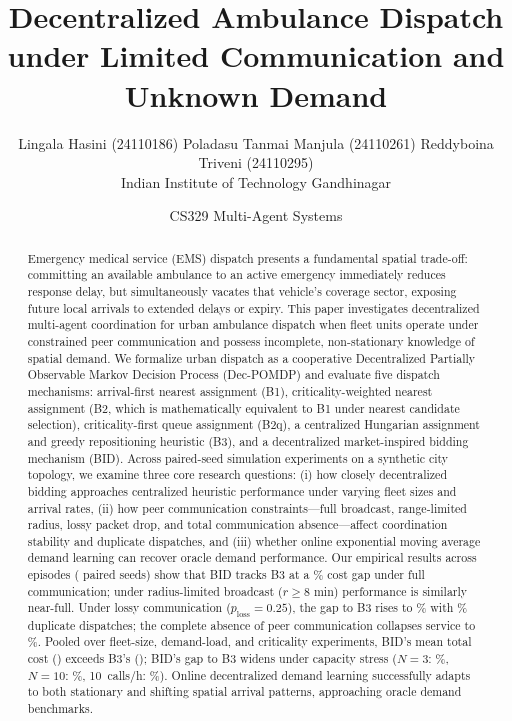\documentclass{article}
\title{Decentralized Ambulance Dispatch under Limited Communication and Unknown Demand}
\author{Lingala Hasini (24110186) \And Poladasu Tanmai Manjula (24110261) \And Reddyboina Triveni (24110295)\\[3pt]
Indian Institute of Technology Gandhinagar}
\date{CS329 Multi-Agent Systems}
\begin{document}
\maketitle

\begin{abstract}
Emergency medical service (EMS) dispatch presents a fundamental spatial trade-off: committing an available ambulance to an active emergency immediately reduces response delay, but simultaneously vacates that vehicle's coverage sector, exposing future local arrivals to extended delays or expiry. This paper investigates decentralized multi-agent coordination for urban ambulance dispatch when fleet units operate under constrained peer communication and possess incomplete, non-stationary knowledge of spatial demand. We formalize urban dispatch as a cooperative Decentralized Partially Observable Markov Decision Process (Dec-POMDP) and evaluate five dispatch mechanisms: arrival-first nearest assignment (B1), criticality-weighted nearest assignment (B2, which is mathematically equivalent to B1 under nearest candidate selection), criticality-first queue assignment (B2q), a centralized Hungarian assignment and greedy repositioning heuristic (B3), and a decentralized market-inspired bidding mechanism (BID). Across paired-seed simulation experiments on a synthetic city topology, we examine three core research questions: (i) how closely decentralized bidding approaches centralized heuristic performance under varying fleet sizes and arrival rates, (ii) how peer communication constraints---full broadcast, range-limited radius, lossy packet drop, and total communication absence---affect coordination stability and duplicate dispatches, and (iii) whether online exponential moving average demand learning can recover oracle demand performance. Our empirical results across \NPolicyRuns{} episodes (\NScenarioSeeds{} paired seeds) show that BID tracks B3 at a \FullBIDCostGapPercent\% cost gap under full communication; under radius-limited broadcast ($r \ge 8$ min) performance is similarly near-full. Under lossy communication ($p_{\mathrm{loss}}=0.25$), the gap to B3 rises to \LossyBIDCostGapPercent\% with \LossyBIDDuplicatePercent\% duplicate dispatches; the complete absence of peer communication collapses service to \NoneBIDServicePercent\%. Pooled over fleet-size, demand-load, and criticality experiments, BID's mean total cost (\PooledBIDTotalCost) exceeds B3's (\PooledBThreeTotalCost); BID's gap to B3 widens under capacity stress ($N=3$: \BIDGapNThreePercent\%, $N=10$: \BIDGapNTenPercent\%, 10~calls/h: \BIDGapTenCallsPercent\%). Online decentralized demand learning successfully adapts to both stationary and shifting spatial arrival patterns, approaching oracle demand benchmarks.
\end{abstract}
\end{document}
